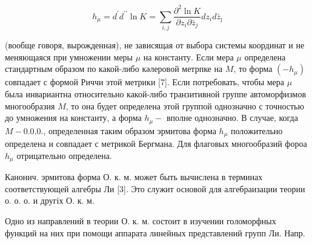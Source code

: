 \documentclass[10pt]{article}
\begin{document}
\[

h_{\mu}=d^{\prime} d^{\prime \prime} \ln K=\sum_{i, j} \frac{\partial^{2} \ln K}{\partial z_{i} \partial \bar{z}_{j}} d z_{i} d \bar{z}_{\jmath}

\]



(вообще говоря, вырожденная), не зависящая от выбора системы координат и не меняющаяся при умножении меры $\mu$ на константу. Если мера $\mu$ определена стандартным образом по какой-либо кәлеровой метрпке на $M$, то форма $\left(-h_{\mu}\right)$ совпадает с формой Риччи этой метрики [7]. Если потребовать, чтобы мера $\mu$ была инвариантна относительно какой-либо транзитивной группе автоморфизмов многообразия $M$, то она будет определена этой группой однозначно с точностью до умножения на константу, а форма $h_{\mu}-$ вполне однозначно. В случае, когда $M-0.0 .0 .$, определенная таким образом эрмитова форма $h_{\mu}$ положительно определена и совпадает с метрикой Бергмана. Для флаговых многообразий фороа $h_{\mu}$ отрицательно определена.



Канонич. эрмитова форма О. к. м. может быть вычислена в терминах соответствующей алгебры Ли [3]. Это служит основой для алгебраизации теории о. о. о. и другіх О. к. м.



Одно из направлений в теории О. к. м. состоит в изучении голоморфных функций на них при помощи аппарата линейных представлений групп Ли. Напр.
\end{document}
